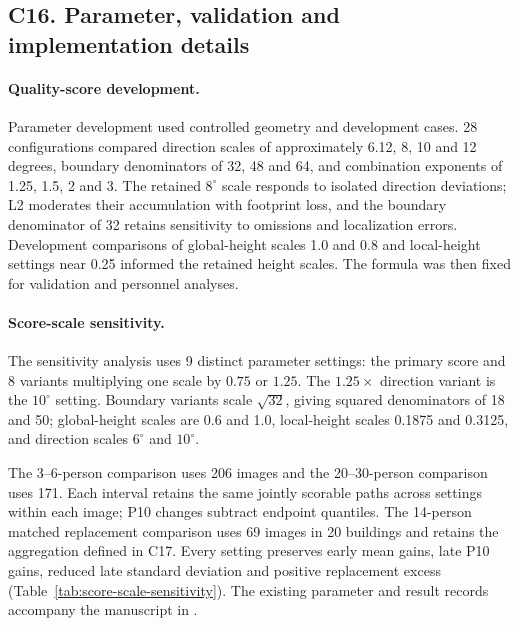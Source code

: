 \clearpage
\subsection*{C16. Parameter, validation and implementation details}
\label{sec:consensus-implementation}



\paragraph{Quality-score development.}
Parameter development used controlled geometry and development cases. 28 configurations compared direction scales of approximately 6.12, 8, 10 and 12 degrees, boundary denominators of 32, 48 and 64, and combination exponents of 1.25, 1.5, 2 and 3. The retained \(8^\circ\) scale responds to isolated direction deviations; L2 moderates their accumulation with footprint loss, and the boundary denominator of 32 retains sensitivity to omissions and localization errors. Development comparisons of global-height scales 1.0 and 0.8 and local-height settings near 0.25 informed the retained height scales. The formula was then fixed for validation and personnel analyses.

\paragraph{Score-scale sensitivity.}
The sensitivity analysis uses 9 distinct parameter settings: the primary score and 8 variants multiplying one scale by $0.75$ or $1.25$. The $1.25\times$ direction variant is the $10^\circ$ setting. Boundary variants scale $\sqrt{32}$, giving squared denominators of 18 and 50; global-height scales are 0.6 and 1.0, local-height scales 0.1875 and 0.3125, and direction scales $6^\circ$ and $10^\circ$.

The 3--6-person comparison uses 206 images and the 20--30-person comparison uses 171. Each interval retains the same jointly scorable paths across settings within each image; P10 changes subtract endpoint quantiles. The 14-person matched replacement comparison uses 69 images in 20 buildings and retains the aggregation defined in C17. Every setting preserves early mean gains, late P10 gains, reduced late standard deviation and positive replacement excess (Table~\ref{tab:score-scale-sensitivity}). The existing parameter and result records accompany the manuscript in .

